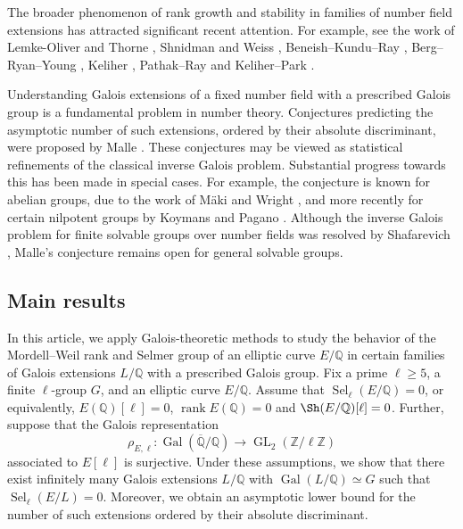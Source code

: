 \documentclass[11pt,reqno]{amsart}
\newcommand{\Z}{\mathbb{Z}}
\newcommand{\Q}{\mathbb{Q}}
\newcommand{\op}[1]{\operatorname{#1}}
\numberwithin{equation}{section}
\begin{document}
The broader phenomenon of rank growth and stability in families of number field extensions has attracted significant recent attention. For example, see the work of Lemke-Oliver and Thorne \cite{Oliverthorne}, Shnidman and Weiss \cite{ShnidmanWeiss}, Beneish--Kundu--Ray \cite{BKR}, Berg--Ryan--Young \cite{Berg}, Keliher \cite{keliher}, Pathak--Ray \cite{pathakray} and Keliher--Park \cite{keliherpark}. %

Understanding Galois extensions of a fixed number field with a prescribed Galois group is a fundamental problem in number theory. Conjectures predicting the asymptotic number of such extensions, ordered by their absolute discriminant, were proposed by Malle \cite{Malle1, Malle2}. These conjectures may be viewed as statistical refinements of the classical inverse Galois problem. Substantial progress towards this has been made in special cases. For example, the conjecture is known for abelian groups, due to the work of Mäki \cite{maki1985density} and Wright \cite{wright1989distribution}, and more recently for certain nilpotent groups by Koymans and Pagano \cite{koymans2023malle}. Although the inverse Galois problem for finite solvable groups over number fields was resolved by Shafarevich \cite{Shaferevich}, Malle's conjecture remains open for general solvable groups.

\subsection{Main results}
In this article, we apply Galois-theoretic methods to study the behavior of the Mordell{--}Weil rank and Selmer group of an elliptic curve \( E/\Q \) in certain families of Galois extensions \( L/\Q \) with a prescribed Galois group. Fix a prime \( \ell \geq 5 \), a finite \( \ell \)-group \( G \), and an elliptic curve \( E/\Q \). Assume that \( \operatorname{Sel}_\ell(E/\Q) = 0 \), or equivalently, $E(\Q)[\ell]=0$, $\op{rank}E(\Q)=0$ and $\Sh(E/\Q)[\ell]=0$. Further, suppose that the Galois representation
\[
\rho_{E,\ell} : \operatorname{Gal}(\overline{\Q}/\Q) \longrightarrow \operatorname{GL}_2(\Z/\ell\Z)
\]
associated to \( E[\ell] \) is surjective. Under these assumptions, we show that there exist infinitely many Galois extensions \( L/\Q \) with \( \operatorname{Gal}(L/\Q) \simeq G \) such that \( \operatorname{Sel}_\ell(E/L) = 0 \). Moreover, we obtain an asymptotic lower bound for the number of such extensions ordered by their absolute discriminant.
\end{document}
